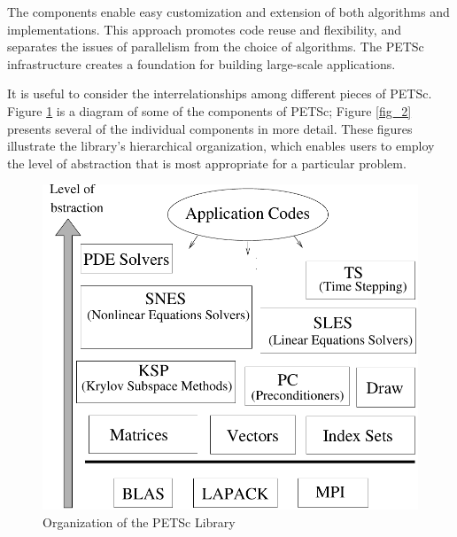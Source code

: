 The components enable easy customization and extension of both algorithms
and implementations.  This approach promotes code reuse and
flexibility, and separates the issues of parallelism from the choice
of algorithms.  The PETSc infrastructure creates a
foundation for building large-scale applications.

It is useful to consider the interrelationships among different
pieces of PETSc.  Figure \ref{fig_1} is a diagram of some 
of the components of PETSc; Figure \ref{fig_2} presents
several of the individual components in more detail.
These figures illustrate the library's hierarchical organization,
which enables users to employ the level of abstraction that is most 
appropriate for a particular problem.  
\begin{figure}[hbt]
\centerline{ \includegraphics{petscwww}}
\caption{Organization of the PETSc Library}
\label{fig_1}
\end{figure}

